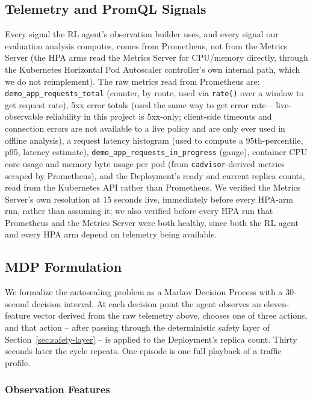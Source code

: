 \subsection{Telemetry and PromQL Signals}

Every signal the RL agent's observation builder uses, and every signal our
evaluation analysis computes, comes from Prometheus, not from the Metrics
Server (the HPA arms read the Metrics Server for CPU/memory directly,
through the Kubernetes Horizontal Pod Autoscaler controller's own internal
path, which we do not reimplement). The raw metrics read from Prometheus
are: \texttt{demo\_\allowbreak app\_\allowbreak requests\_\allowbreak total} (counter, by route, used via
\texttt{rate()} over a window to get request rate), 5xx error totals (used
the same way to get error rate -- live-observable reliability in this
project is 5xx-only; client-side timeouts and connection errors are not
available to a live policy and are only ever used in offline analysis),
a request latency histogram (used to compute a 95th-percentile, p95,
latency estimate), \texttt{demo\_\allowbreak app\_\allowbreak requests\_\allowbreak in\_\allowbreak progress} (gauge),
container CPU core usage and memory byte usage per pod (from
\texttt{cadvisor}-derived metrics scraped by Prometheus), and the
Deployment's ready and current replica counts, read from the Kubernetes API
rather than Prometheus. We verified the Metrics Server's own resolution at
15 seconds live, immediately before every HPA-arm run, rather than assuming
it; we also verified before every HPA run that Prometheus and the Metrics
Server were both healthy, since both the RL agent and every HPA arm depend
on telemetry being available.

\subsection{MDP Formulation}
\label{sec:mdp}

We formalize the autoscaling problem as a Markov Decision Process with a
30-second decision interval. At each decision point the agent observes an
eleven-feature vector derived from the raw telemetry above, chooses one of
three actions, and that action -- after passing through the deterministic
safety layer of Section~\ref{sec:safety-layer} -- is applied to the
Deployment's replica count. Thirty seconds later the cycle repeats. One
episode is one full playback of a traffic profile.

\subsubsection{Observation Features}

